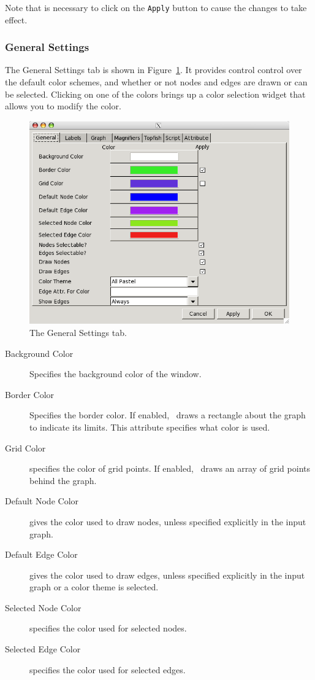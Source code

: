Note that is necessary to click on the {\tt Apply} button to cause the changes to
take effect. 

\subsubsection{General Settings}
\label{sec:general}
The General Settings tab is shown in Figure~\ref{fig:general}.
It provides control control over the default color schemes, and whether
or not nodes and edges are drawn or can be selected.
Clicking on one of the colors brings up a color selection widget that allows
you to modify the color.
\begin{figure}[ht]
\begin{center}
\includegraphics[scale=.5]{figures/general.png}
\caption{\small The General Settings tab.}
\label{fig:general}
\end{center}
\end{figure}
\begin{description}
\item[Background Color] 
Specifies the background color of the window.
\item[Border Color] 
Specifies the border color.
If enabled, \smyrna\ draws a rectangle about the graph to indicate its limits.
This attribute specifies what color is used.
\item[Grid Color] specifies the color of grid points.
If enabled, \smyrna\ draws an array of grid points behind the graph.
\item[Default Node Color] gives the color used to draw nodes, unless specified explicitly
in the input graph.
\item[Default Edge Color] gives the color used to draw edges, unless specified explicitly
in the input graph or a color theme is selected.
\item[Selected Node Color] specifies the color used for selected nodes.
\item[Selected Edge Color] specifies the color used for selected edges.
\end{description}

